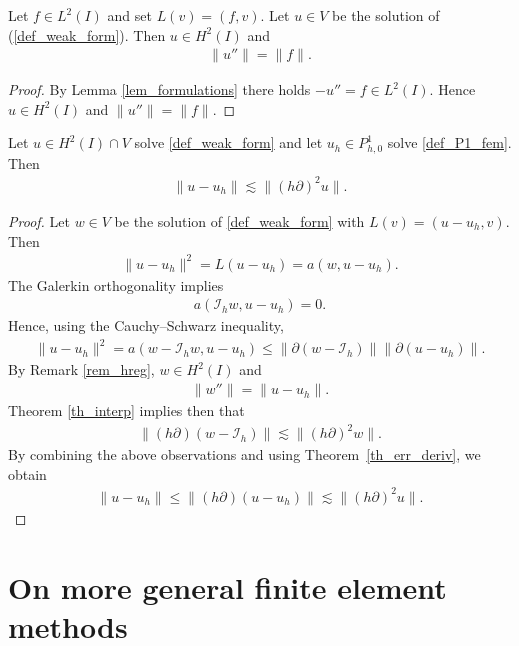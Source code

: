 \documentclass[12pt,oneside,final]{amsart}
\def\p{\partial}
\def\I{\mathcal I}
\begin{document}
\begin{remark}\label{rem_hreg}
Let $f \in L^2(I)$ and set $L(v) = (f, v)$.
Let $u \in V$ be the solution of (\ref{def_weak_form}).
Then $u \in H^2(I)$ and 
    \begin{align*}
\|u''\| = \|f\|.
    \end{align*}
\end{remark}
\begin{proof}
By Lemma \ref{lem_formulations} there holds $-u'' = f \in L^2(I)$. Hence $u \in H^2(I)$ and $\|u''\| = \|f\|$.
\end{proof}

\begin{theorem}\label{th_err}
Let $u \in H^2(I) \cap V$ solve \eqref{def_weak_form}
and let $u_h \in P_{h,0}^1$ solve \eqref{def_P1_fem}.
Then
    \begin{align*}
\|u-u_h\|
\lesssim
\|(h \partial)^2 u\|.
    \end{align*}
\end{theorem}
\begin{proof}
Let $w \in V$ be the solution of \eqref{def_weak_form} with $L(v) = (u - u_h,v)$. Then 
    \begin{align*}
\|u-u_h\|^2 = L(u - u_h) = a(w, u - u_h).
    \end{align*}
The Galerkin orthogonality implies
    \begin{align*}
a(\I_h w, u - u_h) = 0.
    \end{align*}
Hence, using the Cauchy--Schwarz inequality,
    \begin{align*}
\|u-u_h\|^2 
= 
a(w - \I_h w, u - u_h) 
\le 
\|\p(w - \I_h)\|\|\p(u-u_h)\|.
    \end{align*}
By Remark \ref{rem_hreg}, $w \in H^2(I)$ and 
    \begin{align*}
\|w''\| = \|u - u_h\|.
    \end{align*}
Theorem \ref{th_interp} implies then that 
    \begin{align*}
\|(h\p)(w - \I_h)\| \lesssim \|(h\p)^2 w\|.
    \end{align*}
By combining the above observations and using Theorem~\ref{th_err_deriv}, we obtain
    \begin{align*}
\|u-u_h\| 
\le 
\|(h\p)(u-u_h)\| 
\lesssim
\|(h \partial)^2 u\|.
    \end{align*}
\end{proof}

\section{On more general finite element methods}
\end{document}
